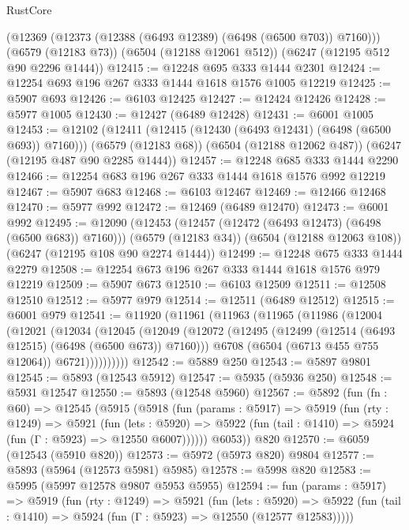 \begin{lexlean}{RustCore}
\begin{coremodule}
    (@12369 (@12373 (@12388 (@6493 @12389) (@6498 (@6500 @703)) @7160)))
    (@6579 (@12183 @73))
    (@6504 (@12188 @12061 @512))
    (@6247 (@12195 @512 @90 @2296 @1444))
@12415 := @12248 @695 @333 @1444 @2301
@12424 := @12254 @693 @196 @267 @333 @1444 @1618 @1576 @1005 @12219
@12425 := @5907 @693
@12426 := @6103 @12425
@12427 := @12424 @12426
@12428 := @5977 @1005
@12430 := @12427 (@6489 @12428)
@12431 := @6001 @1005
@12453 := @12102
    (@12411 (@12415 (@12430 (@6493 @12431) (@6498 (@6500 @693)) @7160)))
    (@6579 (@12183 @68))
    (@6504 (@12188 @12062 @487))
    (@6247 (@12195 @487 @90 @2285 @1444))
@12457 := @12248 @685 @333 @1444 @2290
@12466 := @12254 @683 @196 @267 @333 @1444 @1618 @1576 @992 @12219
@12467 := @5907 @683
@12468 := @6103 @12467
@12469 := @12466 @12468
@12470 := @5977 @992
@12472 := @12469 (@6489 @12470)
@12473 := @6001 @992
@12495 := @12090
    (@12453 (@12457 (@12472 (@6493 @12473) (@6498 (@6500 @683)) @7160)))
    (@6579 (@12183 @34))
    (@6504 (@12188 @12063 @108))
    (@6247 (@12195 @108 @90 @2274 @1444))
@12499 := @12248 @675 @333 @1444 @2279
@12508 := @12254 @673 @196 @267 @333 @1444 @1618 @1576 @979 @12219
@12509 := @5907 @673
@12510 := @6103 @12509
@12511 := @12508 @12510
@12512 := @5977 @979
@12514 := @12511 (@6489 @12512)
@12515 := @6001 @979
@12541 := @11920
    (@11961
      (@11963
        (@11965
          (@11986
            (@12004
              (@12021
                (@12034
                  (@12045
                    (@12049
                      (@12072
                        (@12495 (@12499 (@12514 (@6493 @12515) (@6498 (@6500 @673)) @7160)))
                        @6708
                        (@6504 (@6713 @455 @755 @12064))
                        @6721))))))))))
@12542 := @5889 @250
@12543 := @5897 @9801
@12545 := @5893 (@12543 @5912)
@12547 := @5935 (@5936 @250)
@12548 := @5931 @12547
@12550 := @5893 (@12548 @5960)
@12567 := @5892
    (fun (fn : @60) =>
    @12545
      (@5915
        (@5918
          (fun (params : @5917) =>
          @5919
            (fun (rty : @1249) =>
            @5921
              (fun (lets : @5920) =>
              @5922 (fun (tail : @1410) => @5924 (fun (Γ : @5923) => @12550 @6007))))))
        @6053))
    @820
@12570 := @6059 (@12543 (@5910 @820))
@12573 := @5972 (@5973 @820) @9804
@12577 := @5893 (@5964 (@12573 @5981) @5985)
@12578 := @5998 @820
@12583 := @5995 (@5997 @12578 @9807 @5953 @5955)
@12594 := fun (params : @5917) =>
  @5919
    (fun (rty : @1249) =>
    @5921
      (fun (lets : @5920) =>
      @5922 (fun (tail : @1410) => @5924 (fun (Γ : @5923) => @12550 (@12577 @12583)))))

\end{coremodule}
\end{lexlean}
